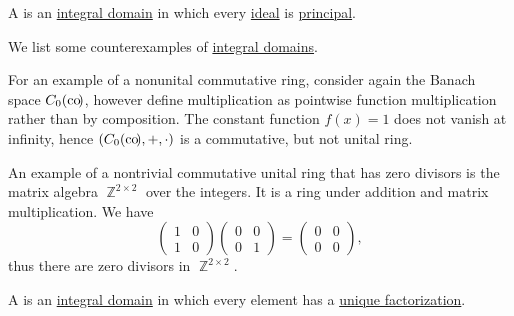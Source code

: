 \begin{definition}\label{def:principal_ideal_domain}
  A  is an \hyperref[def:integral_domain]{integral domain} in which every \hyperref[def:semiring_ideal]{ideal} is \hyperref[def:semiring_ideal/principal]{principal}.
\end{definition}

\begin{example}\label{ex:def:integral_domain}
  We list some counterexamples of \hyperref[def:integral_domain]{integral domains}.

  \begin{refenum}
     For an example of a nonunital commutative ring, consider again the Banach space \( C_0(\operatorname*{co\negthinspace)} \), however define multiplication as pointwise function multiplication rather than by composition. The constant function \( f(x) = 1 \) does not vanish at infinity, hence \( (C_0(\operatorname*{co\negthinspace)}, +, \cdot) \) is a commutative, but not unital ring.

     An example of a nontrivial commutative unital ring that has zero divisors is the matrix algebra \( \BbbZ^{2 \times 2} \) over the integers. It is a ring under addition and matrix multiplication. We have
    \begin{equation*}
      \begin{pmatrix}
        1 & 0 \\
        1 & 0
      \end{pmatrix}
      \begin{pmatrix}
        0 & 0 \\
        0 & 1
      \end{pmatrix}
      =
      \begin{pmatrix}
        0 & 0 \\
        0 & 0
      \end{pmatrix},
    \end{equation*}
    thus there are zero divisors in \( \BbbZ^{2 \times 2} \).
  \end{refenum}
\end{example}

\begin{definition}\label{def:unique_factorization_domain}
  A  is an \hyperref[def:integral_domain]{integral domain} in which every element has a \hyperref[def:factorization_in_ring]{unique factorization}.
\end{definition}

